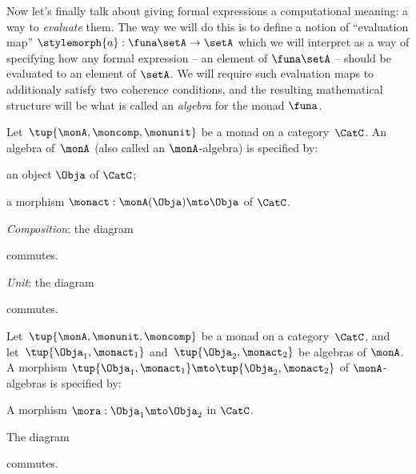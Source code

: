 Now let's finally talk about giving formal expressions a computational meaning: a way to \emph{evaluate} them. The way we will do this is to define a notion of ``evaluation map'' $\stylemorph{a}: \funa \setA \to \setA$ which we will interpret as a way of specifying how any formal expression -- an element of $\funa \setA$ -- should be evaluated to an element of $\setA$. We will require such evaluation maps to additionaly satisfy two coherence conditions, and the resulting mathematical structure will be what is called an \emph{algebra} for the monad $\funa$. 



\begin{ctdefinition}
    \label{def:algebramon}
Let~$\tup{\monA, \moncomp, \monunit}$ be a monad on a category~$\CatC$. An algebra of~$\monA$ (also called an $\monA$-algebra) is specified by: \

\constit
\begin{compactenum}
\item an object $\Obja$ of $\CatC$;
\item a morphism $\monact: \monA(\Obja) \mto \Obja$ of $\CatC$.
\end{compactenum}
\condit
\begin{compactenum}
\item \emph{Composition}: the diagram
\begin{center}
  \end{center}
commutes.
\item \emph{Unit}: the diagram 
\begin{center}
  \end{center}
commutes.
\end{compactenum}
\end{ctdefinition}


\begin{ctdefinition}
    \label{def:algebramorphism}
Let~$\tup{\monA, \monunit, \moncomp}$ be a monad on a category~$\CatC$, and let~$\tup{\Obja_1, \monact_1}$ and~$\tup{\Obja_2, \monact_2}$ be algebras of $\monA$. A morphism $\tup{\Obja_1, \monact_1} \mto \tup{\Obja_2, \monact_2}$ of $\monA$-algebras is specified by: \

\constit
\begin{compactenum}
\item A morphism $\mora : \Obja_1 \mto \Obja_2$ in $\CatC$.
\end{compactenum}
\condit
\begin{compactenum}
\item The diagram
\begin{center}
  \end{center}
commutes. 
\end{compactenum}
\end{ctdefinition}


